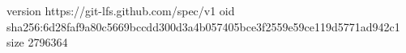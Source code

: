 version https://git-lfs.github.com/spec/v1
oid sha256:6d28faf9a80c5669bccdd300d3a4b057405bce3f2559e59ce119d5771ad942c1
size 2796364
